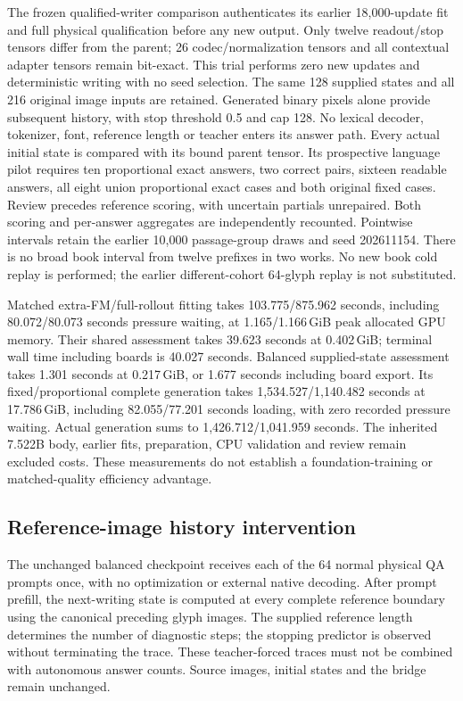 \documentclass[12pt,a4paper]{article}
\providecommand{\DIFadd}[1]{{\protect\color{blue} \sf #1}} %
\begin{document}
\DIFadd{The frozen qualified-writer comparison authenticates its earlier 18,000-update
fit and full physical qualification before any new output. Only twelve
readout/stop tensors differ from the parent; 26 codec/normalization tensors
and all contextual adapter tensors remain bit-exact. This trial performs
zero new updates and deterministic writing with no seed selection. The same
128 supplied states and all 216 original image inputs are retained. Generated
binary pixels alone provide subsequent history, with stop threshold 0.5 and
cap 128. No lexical decoder, tokenizer, font, reference length or teacher
enters its answer path. Every actual initial state is compared with its
bound parent tensor. Its prospective language pilot requires ten proportional
exact answers, two correct pairs, sixteen readable answers, all eight union
proportional exact cases and both original fixed cases. Review precedes
reference scoring, with uncertain partials unrepaired. Both scoring and
per-answer aggregates are independently recounted. Pointwise intervals retain
the earlier 10,000 passage-group draws and seed 202611154. There is no broad
book interval from twelve prefixes in two works. No new book cold replay is
performed; the earlier different-cohort 64-glyph replay is not substituted.
}

\DIFadd{Matched extra-FM/full-rollout fitting takes 103.775/875.962 seconds, including
80.072/80.073 seconds pressure waiting, at 1.165/1.166\,GiB peak allocated GPU
memory. Their shared assessment takes 39.623 seconds at 0.402\,GiB; terminal
wall time including boards is 40.027 seconds. Balanced supplied-state
assessment takes 1.301 seconds at 0.217\,GiB, or 1.677 seconds including board
export. Its fixed/proportional complete generation takes
1,534.527/1,140.482 seconds at 17.786\,GiB, including 82.055/77.201 seconds
loading, with zero recorded pressure waiting. Actual generation sums to
1,426.712/1,041.959 seconds. The inherited 7.522B body, earlier fits, preparation,
CPU validation and review remain excluded costs. These measurements do not
establish a foundation-training or matched-quality efficiency advantage.
}

\subsection*{\DIFadd{Reference-image history intervention}}
\DIFadd{The unchanged balanced checkpoint receives each of the 64 normal physical QA
prompts once, with no optimization or external native decoding. After prompt
prefill, the next-writing state is computed at every complete reference boundary
using the canonical preceding glyph images. The supplied reference length
determines the number of diagnostic steps; the stopping predictor is observed
without terminating the trace. These teacher-forced traces must not be combined
with autonomous answer counts. Source images, initial states and the bridge
remain unchanged.
}
\end{document}
